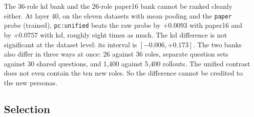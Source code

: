 The 36-role kd bank and the 26-role paper16 bank cannot be ranked cleanly either. %
At layer 40, on the eleven datasets with mean pooling and the \texttt{paper} probe (trained), \texttt{pc:unified} beats the raw probe by $+0.0093$ with paper16 and by $+0.0757$ with kd, roughly eight times as much. %
The kd difference is not significant at the dataset level: its interval is $[-0.006, +0.173]$. %
The two banks also differ in three ways at once: 26 against 36 roles, separate question sets against 30 shared questions, and 1{,}400 against 5{,}400 rollouts. %
The unified contrast does not even contain the ten new roles. %
So the difference cannot be credited to the new personas. %

\subsection{Selection}
\label{sec:r-selection}

